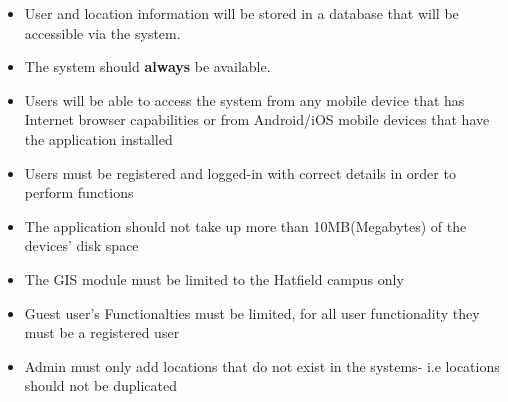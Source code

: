 \begin{itemize}
    \item User and location information will be stored in a database that will be accessible via the system.
    \item The system should \textbf{always} be available.
    \item Users will be able to access the system from any mobile device that has Internet browser capabilities or from Android/iOS mobile devices that have the application installed
    \item Users must be registered and logged-in with correct details in order to perform functions
    \item The application should not take up more than 10MB(Megabytes) of the devices' disk space
    \item The GIS module must be limited to the Hatfield campus only
    \item Guest user's Functionalties must be limited, for all user functionality they must be a registered user
    \item Admin must only add locations that do not exist in the systems- i.e locations should not be duplicated
    
\end{itemize}
